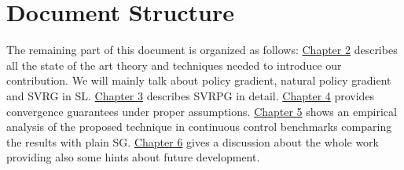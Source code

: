\section{Document Structure}
The remaining part of this document is organized as follows:\newline
\newline
\hyperref[chap:art]{Chapter 2} describes all the state of the art theory and techniques needed to introduce our contribution. We will mainly talk about policy gradient, natural policy gradient and \acs{SVRG} in \acs{SL}.\newline
\hyperref[chap:algorithm]{Chapter 3} describes \acs{SVRPG} in detail.\newline
\hyperref[chap:convergence]{Chapter 4} provides convergence guarantees under proper assumptions.\newline
\hyperref[chap:experiments]{Chapter 5} shows an empirical analysis of the proposed technique in continuous control benchmarks comparing the results with plain \acs{SG}.\newline
\hyperref[chap:conclusions]{Chapter 6} gives a discussion about the whole work providing also some hints about future development.
